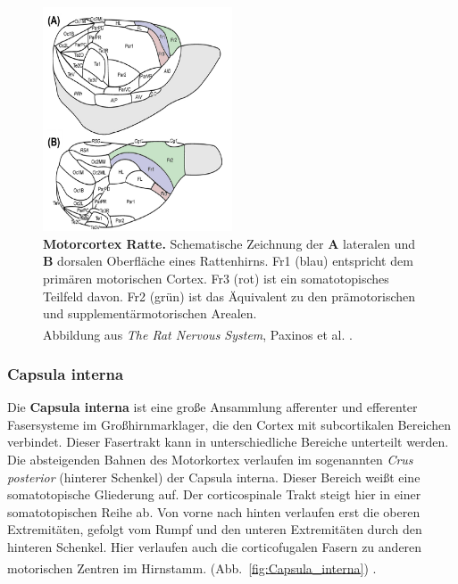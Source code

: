 \begin{figure}[H]
    \centering
    \includegraphics[width=0.5\textwidth]{pictures/Bilder_Laura/rat_motorcortex_1.png}
    \caption[Motorcortex Ratte]{\textbf{Motorcortex Ratte.} Schematische Zeichnung der \textbf{A} lateralen und \textbf{B} dorsalen Oberfläche eines Rattenhirns. Fr1 (blau) entspricht dem primären motorischen Cortex. Fr3 (rot) ist ein somatotopisches Teilfeld davon. Fr2 (grün) ist das Äquivalent zu den prämotorischen und supplementärmotorischen Arealen. \\ Abbildung aus \textit{The Rat Nervous System}, Paxinos et al. \textsuperscript{\cite[22]{paxinos2014rat}}.}
    \label{fig:motorcortex_ratte}
\end{figure}


\subsubsection*{Capsula interna} 
Die \textbf{Capsula interna} ist eine große Ansammlung afferenter und efferenter Fasersysteme im Großhirnmarklager, die den Cortex mit subcortikalen Bereichen verbindet. Dieser Fasertrakt kann in unterschiedliche Bereiche unterteilt werden. Die absteigenden Bahnen des Motorkortex verlaufen im sogenannten \textit{Crus posterior} (hinterer Schenkel) der Capsula interna. Dieser Bereich weißt eine somatotopische Gliederung auf. Der corticospinale Trakt steigt hier in einer somatotopischen Reihe ab. Von vorne nach hinten verlaufen erst die oberen Extremitäten, gefolgt vom Rumpf und den unteren Extremitäten durch den hinteren Schenkel. Hier verlaufen auch die corticofugalen Fasern zu anderen motorischen Zentren im Hirnstamm. (Abb.~\ref{fig:Capsula_interna}) \textsuperscript{\cite[9]{trepel2011neuroanatomie}}.


